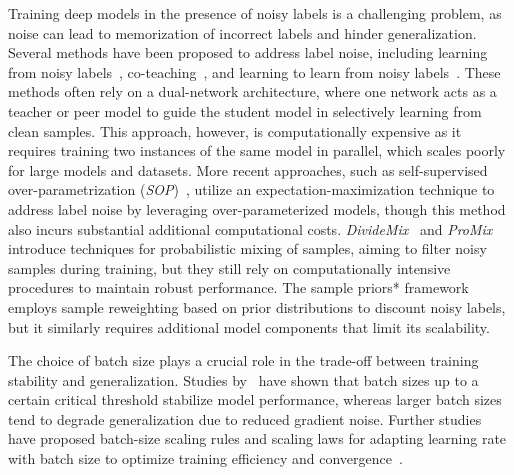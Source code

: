 
Training deep models in the presence of noisy labels is a challenging problem, as noise can lead to memorization of incorrect labels and hinder generalization. Several methods have been proposed to address label noise, including learning from noisy labels~\cite{li2020learning}, co-teaching~\cite{han2018coteaching}, and learning to learn from noisy labels~\cite{ren2018learning}. These methods often rely on a dual-network architecture, where one network acts as a teacher or peer model to guide the student model in selectively learning from clean samples. This approach, however, is computationally expensive as it requires training two instances of the same model in parallel, which scales poorly for large models and datasets. More recent approaches, such as self-supervised over-parametrization (\textit{SOP})~\cite{liu2022self}, utilize an expectation-maximization technique to address label noise by leveraging over-parameterized models, though this method also incurs substantial additional computational costs. \textit{DivideMix}~\cite{li2020dividemix} and \textit{ProMix}~\cite{xiao2023promix} introduce techniques for probabilistic mixing of samples, aiming to filter noisy samples during training, but they still rely on computationally intensive procedures to maintain robust performance. The sample priors* framework~\cite{chen2023sample} employs sample reweighting based on prior distributions to discount noisy labels, but it similarly requires additional model components that limit its scalability.


The choice of batch size plays a crucial role in the trade-off between training stability and generalization. Studies by~\cite{mccandlish2018empirical} have shown that batch sizes up to a certain critical threshold stabilize model performance, whereas larger batch sizes tend to degrade generalization due to reduced gradient noise. Further studies have proposed batch-size scaling rules and scaling laws for adapting learning rate with batch size to optimize training efficiency and convergence~\cite{goyal2018accuratelargeminibatchsgd}.

